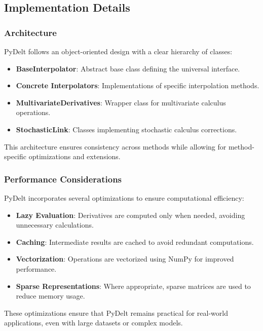 \documentclass[11pt,a4paper]{article}
\begin{document}
\subsection{Implementation Details}

\subsubsection{Architecture}

PyDelt follows an object-oriented design with a clear hierarchy of classes:

\begin{itemize}
    \item \textbf{BaseInterpolator}: Abstract base class defining the universal interface.
    \item \textbf{Concrete Interpolators}: Implementations of specific interpolation methods.
    \item \textbf{MultivariateDerivatives}: Wrapper class for multivariate calculus operations.
    \item \textbf{StochasticLink}: Classes implementing stochastic calculus corrections.
\end{itemize}

This architecture ensures consistency across methods while allowing for method-specific optimizations and extensions.

\subsubsection{Performance Considerations}

PyDelt incorporates several optimizations to ensure computational efficiency:

\begin{itemize}
    \item \textbf{Lazy Evaluation}: Derivatives are computed only when needed, avoiding unnecessary calculations.
    \item \textbf{Caching}: Intermediate results are cached to avoid redundant computations.
    \item \textbf{Vectorization}: Operations are vectorized using NumPy for improved performance.
    \item \textbf{Sparse Representations}: Where appropriate, sparse matrices are used to reduce memory usage.
\end{itemize}

These optimizations ensure that PyDelt remains practical for real-world applications, even with large datasets or complex models.
\end{document}
